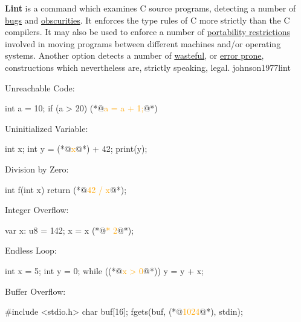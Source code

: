 \documentclass{article}
\begin{document}


  {\textbf{Lint} is a command which examines C source programs, detecting a number of \ul{bugs} and \ul{obscurities}. It enforces the type rules of C more strictly than the C compilers. It may also be used to enforce a number of \ul{portability restrictions} involved in moving programs between different machines and/or operating systems. Another option detects a number of \ul{wasteful}, or \ul{error prone}, constructions which nevertheless are, strictly speaking, legal.}
  {johnson1977lint}

\begin{pptWide}{3}
Unreachable Code:
{\small\begin{ffcode}
int a = 10;
if (a > 20) {
  (*@\textcolor{orange}{a = a + 1;}@*)
}
\end{ffcode}
}\par
Uninitialized Variable:\par
{\small\begin{ffcode}
int x;
int y = (*@\textcolor{orange}{x}@*) + 42;
print(y);
\end{ffcode}
}
\par\columnbreak\par
Division by Zero:\par
{\small\begin{ffcode}
int f(int x) {
  return (*@\textcolor{orange}{42 / x}@*);
}
\end{ffcode}
}\par
Integer Overflow:\par
{\small\begin{ffcode}
var x: u8 = 142;
x = x (*@\textcolor{orange}{* 2}@*);
\end{ffcode}
}
\par\columnbreak\par
Endless Loop:
{\small\begin{ffcode}
int x = 5;
int y = 0;
while ((*@\textcolor{orange}{x > 0}@*)) {
  y = y + x;
}
\end{ffcode}
}\par
Buffer Overflow:
{\small\begin{ffcode}
#include <stdio.h>
char buf[16];
fgets(buf, (*@\textcolor{orange}{1024}@*), stdin);
\end{ffcode}
}
\end{pptWide}
\plush{}
\end{document}
